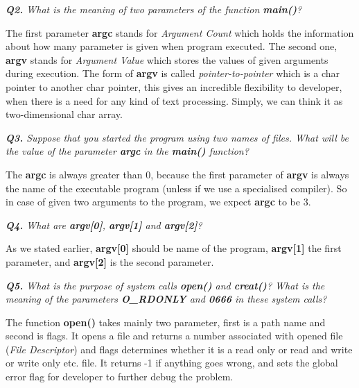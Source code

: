 \documentclass[11pt]{article}
\begin{document}
\vspace{3mm}
\textit{\textbf{Q2.} What is the meaning of two parameters of the function \textbf{main()}?}
\vspace{3mm}

The first parameter \textbf{argc} stands for \textit{Argument Count} which holds the information about how many parameter is given when program executed. The second one, \textbf{argv} stands for \textit{Argument Value} which stores the values of given arguments during execution. The form of \textbf{argv} is called \textit{pointer-to-pointer} which is a char pointer to another char pointer, this gives an incredible flexibility to developer, when there is a need for any kind of text processing. Simply, we can think it as two-dimensional char array.

\vspace{3mm}
\textit{\textbf{Q3.} Suppose that you started the program using two names of files. What will be the value of the parameter \textbf{argc} in the \textbf{main()} function?}
\vspace{3mm}

The \textbf{argc} is always greater than 0, because the first parameter of \textbf{argv} is always the name of the executable program (unless if we use a specialised compiler). So in case of given two arguments to the program, we expect \textbf{argc} to be 3.

\vspace{5mm}
\textit{\textbf{Q4.} What are \textbf{argv[0]}, \textbf{argv[1]} and \textbf{argv[2]}?}
\vspace{5mm}

As we stated earlier, \textbf{argv[0]} should be name of the program, \textbf{argv[1]} the first parameter, and \textbf{argv[2]} is the second parameter. 

\vspace{5mm}
\textit{\textbf{Q5.} What is the purpose of system calls \textbf{open()} and \textbf{creat()}? What is the meaning of the parameters \textbf{O\_RDONLY} and \textbf{0666} in these system calls?}
\vspace{5mm}

The function \textbf{open()} takes mainly two parameter, first is a path name and second is flags. It opens a file and returns a number associated with opened file (\textit{File Descriptor}) and flags determines whether it is a read only or read and write or write only etc. file. It returns -1 if anything goes wrong, and sets the global error flag for developer to further debug the problem. 
\end{document}
